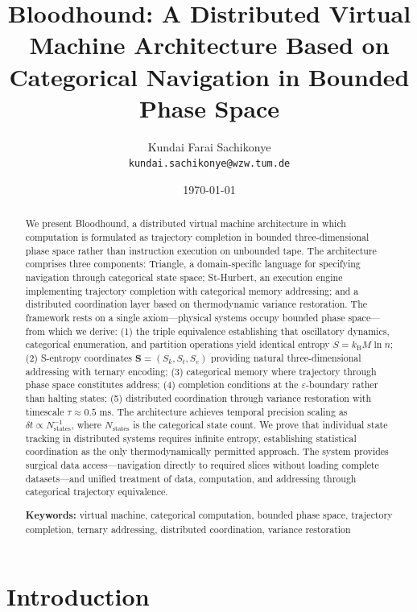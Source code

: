 \documentclass[10pt,twocolumn]{article}
\title{\textbf{Bloodhound: A Distributed Virtual Machine Architecture Based on Categorical Navigation in Bounded Phase Space}}
\author{
Kundai Farai Sachikonye\\
\texttt{kundai.sachikonye@wzw.tum.de}
}
\date{\today}
\theoremstyle{definition}
\theoremstyle{remark}
\newcommand{\kB}{k_{\mathrm{B}}}
\newcommand{\Sk}{S_k}
\newcommand{\St}{S_t}
\newcommand{\Se}{S_e}
\newcommand{\Scoord}{\mathbf{S}}
\begin{document}
\maketitle

\begin{abstract}
We present Bloodhound, a distributed virtual machine architecture in which computation is formulated as trajectory completion in bounded three-dimensional phase space rather than instruction execution on unbounded tape. The architecture comprises three components: Triangle, a domain-specific language for specifying navigation through categorical state space; St-Hurbert, an execution engine implementing trajectory completion with categorical memory addressing; and a distributed coordination layer based on thermodynamic variance restoration. The framework rests on a single axiom---physical systems occupy bounded phase space---from which we derive: (1) the triple equivalence establishing that oscillatory dynamics, categorical enumeration, and partition operations yield identical entropy $S = \kB M \ln n$; (2) S-entropy coordinates $\Scoord = (\Sk, \St, \Se)$ providing natural three-dimensional addressing with ternary encoding; (3) categorical memory where trajectory through phase space constitutes address; (4) completion conditions at the $\varepsilon$-boundary rather than halting states; (5) distributed coordination through variance restoration with timescale $\tau \approx 0.5$ ms. The architecture achieves temporal precision scaling as $\delta t \propto N_{\text{states}}^{-1}$, where $N_{\text{states}}$ is the categorical state count. We prove that individual state tracking in distributed systems requires infinite entropy, establishing statistical coordination as the only thermodynamically permitted approach. The system provides surgical data access---navigation directly to required slices without loading complete datasets---and unified treatment of data, computation, and addressing through categorical trajectory equivalence.

\textbf{Keywords:} virtual machine, categorical computation, bounded phase space, trajectory completion, ternary addressing, distributed coordination, variance restoration
\end{abstract}

\section{Introduction}
\label{sec:introduction}
\end{document}
